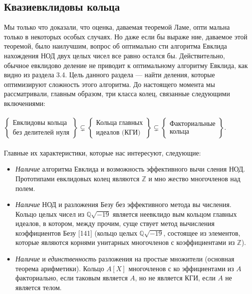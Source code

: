 \documentclass{mai_book}
\begin{document}
\subsection{Квазиевклидовы кольца}
\noindent Мы только что доказали, что оценка, даваемая теоремой Ламе, опти­
мальна только в некоторых особых случаях. Но даже если бы выраже­
ние, даваемое этой теоремой, было наилучшим, вопрос об оптимально­
сти алгоритма Евклида нахождения НОД двух целых чисел все равно
остался бы. Действительно, обычное евклидово деление не приводит
к оптимальному алгоритму Евклида, как видно из раздела 3.4. Цель
данного раздела — найти деления, которые оптимизируют сложность
этого алгоритма. До настоящего момента мы рассматривали, главным
образом, три класса колец, связанные следующими включениями:
\\\\
$ \left\lbrace
\begin{array}{c}
\text{Евклидовы кольца} \\
\text{без делителей нуля}
\end{array}
\right\rbrace \subsetneq
\left\lbrace
\begin{array}{l}
\text{Кольца главных} \\
\text{идеалов (КГИ)}
\end{array}
\right\rbrace \subsetneq
\left\lbrace
\begin{array}{l}
\text{Факториальные} \\
\text{кольца}
\end{array}
\right\rbrace .$
\\\\
Главные их характеристики, которые нас интересуют, следующие:
\begin{itemize}


\item\textit{Наличие} алгоритма Евклида и возможность эффективного вычи­
сления НОД. Прототипами евклидовых колец являются $\mathbb{Z}$ и мно­
жество многочленов над полем.
\item\textit{Наличие} НОД и разложения Безу без эффективного метода вы­
числения. Кольцо целых чисел из $\mathbb{Q}\sqrt{-19}$ является неевклидо­
вым кольцом главных идеалов, в котором, между прочим, суще­
ствует метод вычисления коэффициентов Безу [141] (кольцо це­лых $\mathbb{Q}\sqrt{-19}$, состоящее из элементов, которые являются корнями
унитарных многочленов с коэффициентами из $\mathbb{Z}$).
\item\textit{Наличие} и \textit{единственность} разложения на простые множители
(основная теорема арифметики). Кольцо $A[X]$ многочленов с ко­
эффициентами из $A$ факториально, если таковым является $A$, но
не является КГИ, если $A$ не является телом.
\end{itemize}
\end{document}
